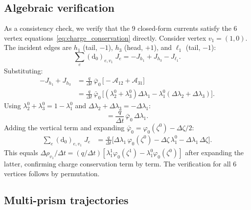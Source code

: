 \documentclass[11pt,a4paper]{article}
\newcommand{\dd}{\mathrm{d}}
\begin{document}
\subsection{Algebraic verification}
\label{sec:verification}

As a consistency check, we verify that the 9 closed-form currents satisfy the
6 vertex equations~\eqref{eq:charge_conservation} directly. Consider vertex
$v_1 = (1,0)$. The incident edges are $h_1$ (tail, $-1$), $h_3$ (head, $+1$),
and $\ell_1$ (tail, $-1$):
\begin{equation}
  \sum_e (\dd_0)_{e,v_1}\;J_e = -J_{h_1} + J_{h_3} - J_{\ell_1}.
\end{equation}
Substituting:
\begin{align}
  -J_{h_1} + J_{h_3}
    &= \frac{q}{\Delta t}\,\bar\varphi_0\,\bigl[
      -\mathcal{A}_{12} + \mathcal{A}_{31}\bigr] \nonumber\\
    &= \frac{q}{\Delta t}\,\bar\varphi_0\,\bigl[
      (\lambda_2^0 + \lambda_3^0)\Delta\lambda_1
      - \lambda_1^0(\Delta\lambda_2 + \Delta\lambda_3)\bigr].
\end{align}
Using $\lambda_2^0 + \lambda_3^0 = 1 - \lambda_1^0$ and
$\Delta\lambda_2 + \Delta\lambda_3 = -\Delta\lambda_1$:
\begin{equation}
  = \frac{q}{\Delta t}\,\bar\varphi_0\,\Delta\lambda_1.
\end{equation}
Adding the vertical term and expanding
$\bar\varphi_0 = \varphi_0(\zeta^0) - \Delta\zeta/2$:
\begin{align}
  \sum_e (\dd_0)_{e,v_1}\;J_e
    &= \frac{q}{\Delta t}\bigl[
      \Delta\lambda_1\,\varphi_0(\zeta^0)
      - \Delta\zeta\,\lambda_1^0
      - \Delta\lambda_1\,\Delta\zeta
    \bigr].
\end{align}
This equals
$\Delta\rho_{v_1}/\Delta t = (q/\Delta t)[\lambda_1^1\varphi_0(\zeta^1) -
\lambda_1^0\varphi_0(\zeta^0)]$ after expanding the latter, confirming charge
conservation term by term. The verification for all 6 vertices follows by
permutation.

\subsection{Multi-prism trajectories}
\label{sec:multi_prism}
\end{document}
